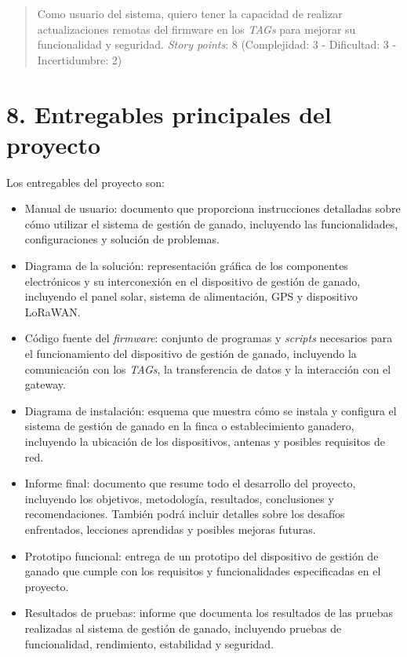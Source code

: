 \documentclass[
11pt, %
]{charter}
\begin{document}
\begin{quote}
Como usuario del sistema, quiero tener la capacidad de realizar actualizaciones remotas del firmware en los \emph{TAGs} para mejorar su funcionalidad y seguridad. \emph{Story points}: 8 (Complejidad: 3 - Dificultad: 3 - Incertidumbre: 2)
\end{quote} 


\section{8. Entregables principales del proyecto}
\label{sec:entregables}

Los entregables del proyecto son:

\begin{itemize}
	\item Manual de usuario: documento que proporciona instrucciones detalladas sobre cómo utilizar el sistema de gestión de ganado, incluyendo las funcionalidades, configuraciones y solución de problemas.
	\item Diagrama de la solución: representación gráfica de los componentes electrónicos y su interconexión en el dispositivo de gestión de ganado, incluyendo el panel solar, sistema de alimentación, GPS y dispositivo LoRaWAN.
	\item Código fuente del \emph{firmware}: conjunto de programas y \emph{scripts} necesarios para el funcionamiento del dispositivo de gestión de ganado, incluyendo la comunicación con los \emph{TAGs}, la transferencia de datos y la interacción con el gateway.
	\item Diagrama de instalación: esquema que muestra cómo se instala y configura el sistema de gestión de ganado en la finca o establecimiento ganadero, incluyendo la ubicación de los dispositivos, antenas y posibles requisitos de red.
	\item Informe final: documento que resume todo el desarrollo del proyecto, incluyendo los objetivos, metodología, resultados, conclusiones y recomendaciones. También podrá incluir detalles sobre los desafíos enfrentados, lecciones aprendidas y posibles mejoras futuras.
	\item Prototipo funcional: entrega de un prototipo del dispositivo de gestión de ganado que cumple con los requisitos y funcionalidades especificadas en el proyecto.
	\item Resultados de pruebas: informe que documenta los resultados de las pruebas realizadas al sistema de gestión de ganado, incluyendo pruebas de funcionalidad, rendimiento, estabilidad y seguridad.
\end{itemize}
\end{document}
